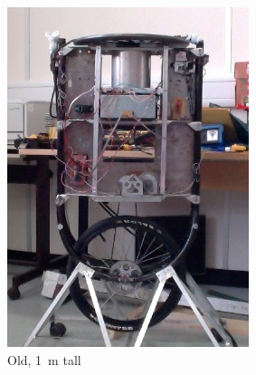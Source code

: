 \documentclass[main.tex]{subfiles}
\begin{document}
	\begin{figure}[!b]
		\hspace*{\fill}
		\begin{subfigure}{0.3\linewidth}
			\includegraphics[width=\linewidth]{figures/old.jpg}
			\caption{Old, \SI{1}{\meter} tall}
			\label{fig:uni-old}
		\end{subfigure}%
		\hfill%
		\begin{subfigure}{0.3\linewidth}

\end{subfigure}
\end{figure}
\end{document}
